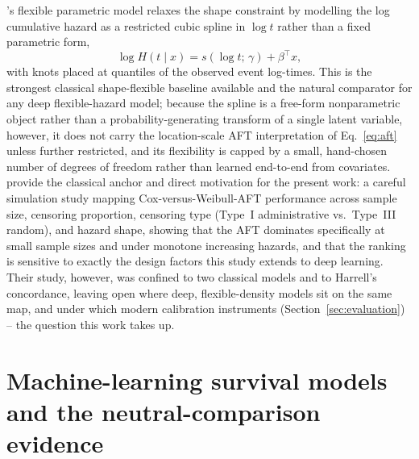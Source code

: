 \documentclass[11pt]{article}
\begin{document}
\citet{royston2002}'s flexible parametric model relaxes the shape
constraint by modelling the log cumulative hazard as a restricted cubic
spline in $\log t$ rather than a fixed parametric form,
\[
  \log H(t\mid x) = s(\log t;\, \gamma) + \beta^\top x,
\]
with knots placed at quantiles of the observed event log-times. This is
the strongest classical shape-flexible baseline available and the natural
comparator for any deep flexible-hazard model; because the spline is a
free-form nonparametric object rather than a probability-generating
transform of a single latent variable, however, it does not carry the
location-scale AFT interpretation of Eq.~\eqref{eq:aft} unless further
restricted, and its flexibility is capped by a small, hand-chosen number
of degrees of freedom rather than learned end-to-end from covariates.
\citet{opatha2024} provide the classical anchor and direct motivation for
the present work: a careful simulation study mapping Cox-versus-Weibull-AFT
performance across sample size, censoring proportion, censoring type
(Type~I administrative vs.\ Type~III random), and hazard shape, showing that
the AFT dominates specifically at small sample sizes and under monotone
increasing hazards, and that the ranking is sensitive to exactly the design
factors this study extends to deep learning. Their study, however, was
confined to two classical models and to Harrell's concordance, leaving
open where deep, flexible-density models sit on the same map, and under
which modern calibration instruments (Section~\ref{sec:evaluation}) --
the question this work takes up.

\section{Machine-learning survival models and the neutral-comparison evidence}
\label{sec:ml}
\end{document}
